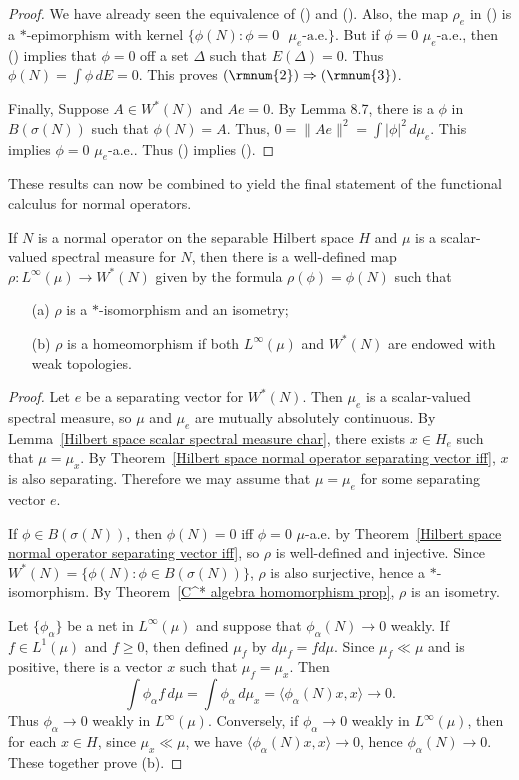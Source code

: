 \begin{proof}
We have already seen the equivalence of () and (). Also, the map $\rho_e$ in () is a $*$-epimorphism with kernel $\{\phi(N):\text{$\phi=0$ $\mu_e$-a.e.}\}$. But if $\phi=0$ $\mu_e$-a.e., then () implies that $\phi=0$ off a set $\Delta$ such that $E(\Delta)=0$. Thus $\phi(N)=\int\phi\,dE=0$. This proves $(\rmnum{2})\Rightarrow(\rmnum{3})$.\par
Finally, Suppose $A\in W^*(N)$ and $Ae=0$. By Lemma 8.7, there is a $\phi$ in $B(\sigma(N))$ such that $\phi(N)=A$. Thus, $0=\|Ae\|^2=\int|\phi|^2\,d\mu_e$. This implies $\phi=0$ $\mu_e$-a.e.. Thus () implies (). 
\end{proof}
These results can now be combined to yield the final statement of the functional calculus for normal operators.
\begin{theorem}\label{Hilbert space normal operator functional calculus prop}
If $N$ is a normal operator on the separable Hilbert space $H$ and $\mu$ is a scalar-valued spectral measure for $N$, then there is a well-defined map $\rho:L^\infty(\mu)\to W^*(N)$ given by the formula $\rho(\phi)=\phi(N)$ such that
\begin{itemize}
\item[(a)] $\rho$ is a $*$-isomorphism and an isometry;
\item[(b)] $\rho$ is a homeomorphism if both $L^\infty(\mu)$ and $W^*(N)$ are endowed with weak topologies.
\end{itemize}
\end{theorem}
\begin{proof}
Let $e$ be a separating vector for $W^*(N)$. Then $\mu_e$ is a scalar-valued spectral measure, so $\mu$ and $\mu_e$ are mutually absolutely continuous. By Lemma~\ref{Hilbert space scalar spectral measure char}, there exists $x\in H_e$ such that $\mu=\mu_x$. By Theorem~\ref{Hilbert space normal operator separating vector iff}, $x$ is also separating. Therefore we may assume that $\mu=\mu_e$ for some separating vector $e$.\par
If $\phi\in B(\sigma(N))$, then $\phi(N)=0$ iff $\phi=0$ $\mu$-a.e. by Theorem~\ref{Hilbert space normal operator separating vector iff}, so $\rho$ is well-defined and injective. Since $W^*(N)=\{\phi(N):\phi\in B(\sigma(N))\}$, $\rho$ is also surjective, hence a $*$-isomorphism. By Theorem~\ref{C^* algebra homomorphism prop}, $\rho$ is an isometry.\par
Let $\{\phi_\alpha\}$ be a net in $L^\infty(\mu)$ and suppose that $\phi_\alpha(N)\to 0$ weakly. If $f\in L^1(\mu)$ and $f\geq 0$, then defined $\mu_f$ by $d\mu_f=fd\mu$. Since $\mu_f\ll\mu$ and is positive, there is a vector $x$ such that $\mu_f=\mu_x$. Then
\[\int\phi_\alpha f\,d\mu=\int\phi_\alpha\,d\mu_x=\langle\phi_\alpha(N)x,x\rangle\to 0.\]
Thus $\phi_\alpha\to 0$ weakly in $L^\infty(\mu)$. Conversely, if $\phi_\alpha\to 0$ weakly in $L^\infty(\mu)$, then for each $x\in H$, since $\mu_x\ll\mu$, we have $\langle\phi_\alpha(N)x,x\rangle\to 0$, hence $\phi_\alpha(N)\to 0$. These together prove (b).
\end{proof}
